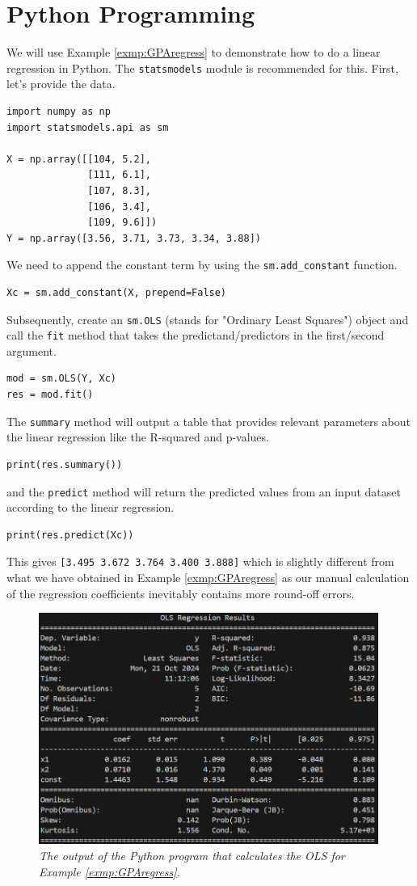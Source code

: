 \section{Python Programming}

We will use Example \ref{exmp:GPAregress} to demonstrate how to do a linear regression in Python. The \verb|statsmodels| module is recommended for this. First, let's provide the data.
\begin{lstlisting}
import numpy as np
import statsmodels.api as sm

X = np.array([[104, 5.2],
              [111, 6.1],
              [107, 8.3],
              [106, 3.4],
              [109, 9.6]]) 
Y = np.array([3.56, 3.71, 3.73, 3.34, 3.88])
\end{lstlisting}
We need to append the constant term by using the \verb|sm.add_constant| function.
\begin{lstlisting}
Xc = sm.add_constant(X, prepend=False)    
\end{lstlisting}
Subsequently, create an \verb|sm.OLS| (stands for "Ordinary Least Squares") object and call the \verb|fit| method that takes the predictand/predictors in the first/second argument.
\begin{lstlisting}
mod = sm.OLS(Y, Xc)
res = mod.fit()
\end{lstlisting}
The \verb|summary| method will output a table that provides relevant parameters about the linear regression like the R-squared and p-values.
\begin{lstlisting}
print(res.summary())
\end{lstlisting}
and the \verb|predict| method will return the predicted values from an input dataset according to the linear regression.
\begin{lstlisting}
print(res.predict(Xc))    
\end{lstlisting}
This gives \verb|[3.495 3.672 3.764 3.400 3.888]| which is slightly different from what we have obtained in Example \ref{exmp:GPAregress} as our manual calculation of the regression coefficients inevitably contains more round-off errors.
\begin{figure}[ht!]
    \centering
    \includegraphics[width=0.99\textwidth]{graphics/OLS_table.png}
    \caption{\textit{The output of the Python program that calculates the OLS for Example \ref{exmp:GPAregress}.}}
\end{figure}

